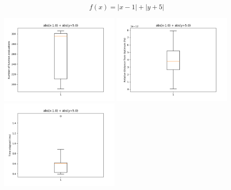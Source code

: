 \documentclass[11pt]{article}
\begin{document}
\begin{enumerate}
\begin{enumerate}
	\vspace{50mm}
	$$f(x) = |x - 1| + |y + 5|$$
	
	\includegraphics[width=6cm]{report_images/2d_func_2/Number_of_function_evaluations.png}
	\includegraphics[width=6cm]{report_images/2d_func_2/Relative_Distance_from_Optimum.png}
	\includegraphics[width=6cm]{report_images/2d_func_2/Time_elapsed.png}
\end{enumerate}



\end{enumerate}
\end{document}
